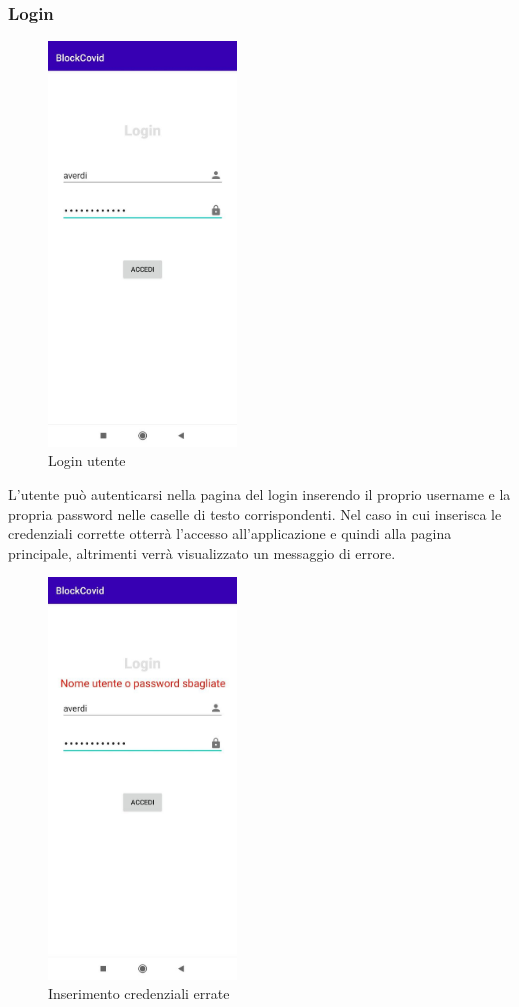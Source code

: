 	\subsubsection{Login}
	\begin{figure}[H]
		\centering
		\includegraphics[width=5cm]{res/images/loginDipendente.png}
		\caption{Login utente}
	\end{figure}
	L'utente può autenticarsi nella pagina del login inserendo il proprio username e la propria password nelle caselle di testo corrispondenti.
	Nel caso in cui inserisca le credenziali corrette otterrà l'accesso all'applicazione e quindi alla pagina principale, altrimenti verrà visualizzato un messaggio di errore.
	\begin{figure}[H]
		\centering
		\includegraphics[width=5cm]{res/images/credenzialiErrate.png}
		\caption{Inserimento credenziali errate}
	\end{figure}
	
